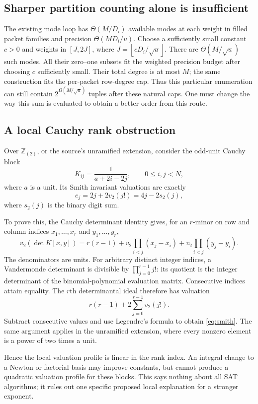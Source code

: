 \documentclass[11pt]{article}
\theoremstyle{remark}
\newcommand{\Z}{\mathbb Z}
\newcommand{\floor}[1]{\left\lfloor #1\right\rfloor}
\begin{document}
\subsection{Sharper partition counting alone is insufficient}
The existing mode loop has \(\Theta(M/D_i)\) available modes at each
weight in filled packet families and precision
\(\Theta(MD_i/u)\).
Choose a sufficiently small constant \(c>0\) and weights in
\([J,2J]\), where \(J=\floor{cD_i/\sqrt u}\).
There are \(\Theta(M/\sqrt u)\) such modes.
All their zero--one subsets fit the weighted precision budget after
choosing \(c\) sufficiently small. Their total degree is at most \(M\);
the same construction fits the per-packet row-degree cap.
Thus this particular enumeration can still contain
\(2^{\Omega(M/\sqrt u)}\) tuples after these natural caps.
One must change the way this sum is evaluated to obtain a better order
from this route.

\subsection{A local Cauchy rank obstruction}\label{subsec:smith}
Over \(\Z_{(2)}\), or the source's unramified extension,
consider the odd-unit Cauchy block
\[
 K_{ij}=\frac1{a+2i-2j},\qquad 0\le i,j<N,
\]
where \(a\) is a unit. Its Smith invariant valuations are exactly
\begin{equation}\label{eq:smith}
 e_j=2j+2v_2(j!)=4j-2s_2(j),
\end{equation}
where \(s_2(j)\) is the binary digit sum.

To prove this, the Cauchy determinant identity gives, for an \(r\)-minor
on row and column indices \(x_1,\ldots,x_r\) and \(y_1,\ldots,y_r\),
\[
 v_2(\det K[x,y])
 =r(r-1)+v_2\!\prod_{i<j}(x_j-x_i)
          +v_2\!\prod_{i<j}(y_j-y_i).
\]
The denominators are units.
For arbitrary distinct integer indices, a Vandermonde determinant
is divisible by \(\prod_{j=0}^{r-1}j!\):
its quotient is the integer determinant of the binomial-polynomial
evaluation matrix. Consecutive indices attain equality.
The \(r\)th determinantal ideal therefore has valuation
\[
 r(r-1)+2\sum_{j=0}^{r-1}v_2(j!).
\]
Subtract consecutive values and use Legendre's formula to obtain
\eqref{eq:smith}. The same argument applies in the unramified extension,
where every nonzero element is a power of two times a unit.

Hence the local valuation profile is linear in the rank index.
An integral change to a Newton or factorial basis may improve
constants, but cannot produce a quadratic valuation profile for
these blocks. This says nothing about all SAT algorithms; it rules
out one specific proposed local explanation for a stronger exponent.
\end{document}
